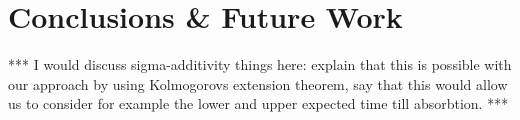 \documentclass[10pt]{paper}
\theoremstyle{definition}
\newtheorem{proposition}[theorem]{Proposition}
\newcommand{\reals}{\mathbb{R}}
\newcommand{\realsnonneg}{\reals_{\geq 0}}
\newcommand{\states}{\mathcal{X}}
\newcommand{\gambles}{\mathcal{L}}
\newcommand{\norm}[1]{\left\lVert #1 \right\rVert}
\newcommand{\coloneqq}{:\!=}
\begin{document}
\section{Conclusions \& Future Work}\label{sec:conclusions}

*** I would discuss sigma-additivity things here: explain that this is possible with our approach by using Kolmogorovs extension theorem, say that this would allow us to consider for example the lower and upper expected time till absorbtion. ***

%
%
%
%
%
\end{document}
